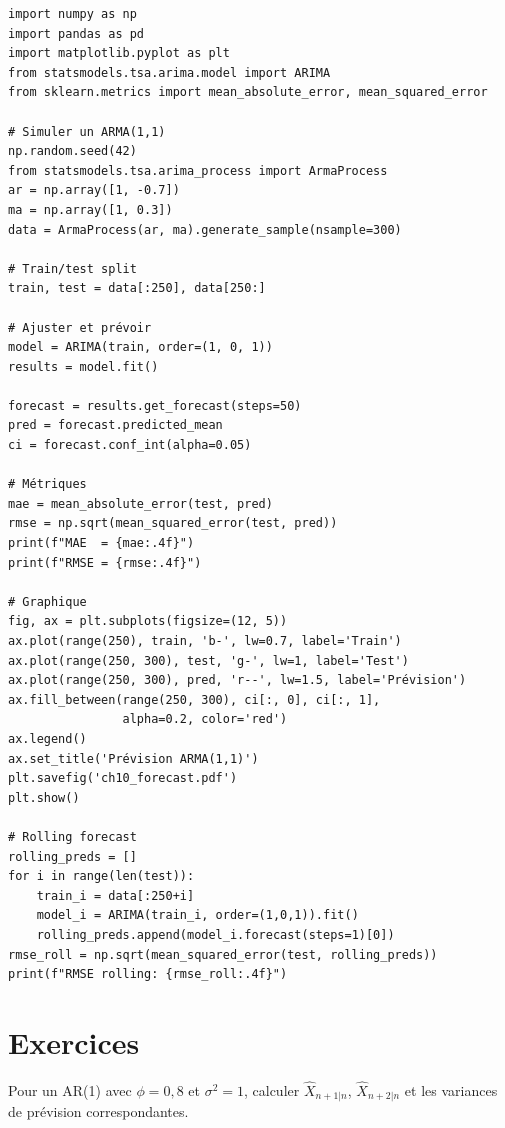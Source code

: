 \begin{codeblock}[title=\textbf{Python}]
\begin{verbatim}
import numpy as np
import pandas as pd
import matplotlib.pyplot as plt
from statsmodels.tsa.arima.model import ARIMA
from sklearn.metrics import mean_absolute_error, mean_squared_error

# Simuler un ARMA(1,1)
np.random.seed(42)
from statsmodels.tsa.arima_process import ArmaProcess
ar = np.array([1, -0.7])
ma = np.array([1, 0.3])
data = ArmaProcess(ar, ma).generate_sample(nsample=300)

# Train/test split
train, test = data[:250], data[250:]

# Ajuster et prévoir
model = ARIMA(train, order=(1, 0, 1))
results = model.fit()

forecast = results.get_forecast(steps=50)
pred = forecast.predicted_mean
ci = forecast.conf_int(alpha=0.05)

# Métriques
mae = mean_absolute_error(test, pred)
rmse = np.sqrt(mean_squared_error(test, pred))
print(f"MAE  = {mae:.4f}")
print(f"RMSE = {rmse:.4f}")

# Graphique
fig, ax = plt.subplots(figsize=(12, 5))
ax.plot(range(250), train, 'b-', lw=0.7, label='Train')
ax.plot(range(250, 300), test, 'g-', lw=1, label='Test')
ax.plot(range(250, 300), pred, 'r--', lw=1.5, label='Prévision')
ax.fill_between(range(250, 300), ci[:, 0], ci[:, 1],
                alpha=0.2, color='red')
ax.legend()
ax.set_title('Prévision ARMA(1,1)')
plt.savefig('ch10_forecast.pdf')
plt.show()

# Rolling forecast
rolling_preds = []
for i in range(len(test)):
    train_i = data[:250+i]
    model_i = ARIMA(train_i, order=(1,0,1)).fit()
    rolling_preds.append(model_i.forecast(steps=1)[0])
rmse_roll = np.sqrt(mean_squared_error(test, rolling_preds))
print(f"RMSE rolling: {rmse_roll:.4f}")
\end{verbatim}
\end{codeblock}

\section{Exercices}

\begin{exercice}[$\star$]
Pour un AR(1) avec $\phi=0{,}8$ et $\sigma^2=1$, calculer $\hat{X}_{n+1|n}$, $\hat{X}_{n+2|n}$ et les variances de pr\'evision correspondantes.
\end{exercice}


